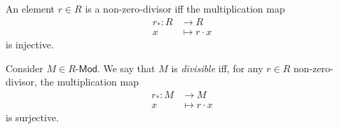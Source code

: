 \documentclass[../Main]{subfiles}
\begin{document}
\begin{rem}[]
	An element $r \in R$ is a non-zero-divisor
	iff the multiplication map 
	\begin{align}
		r_*\colon R &\longrightarrow R \\
		x &\longmapsto r \cdot x \nonumber
	\end{align} 
	is injective.
\end{rem}

\begin{defn}
	Consider $M \in R\text{-}\mathsf{Mod}$.
	We say that $M$ is {\em divisible} iff, for any $r \in R$ non-zero-divisor,
	the multiplication map
	\begin{align}
		r_*\colon M &\longrightarrow M \\
		x &\longmapsto r \cdot x \nonumber
	\end{align} 
	is surjective.
\end{defn}
\end{document}
